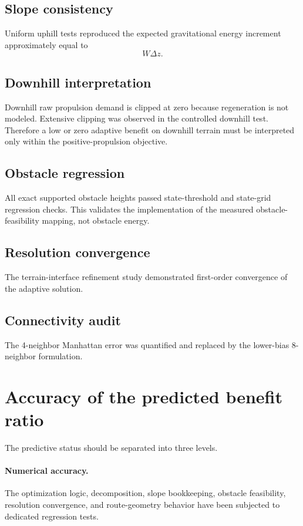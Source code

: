 \documentclass[11pt]{article}
\begin{document}
\subsection{Slope consistency}
Uniform uphill tests reproduced the expected gravitational energy increment approximately equal to
\begin{equation}
W\Delta z.
\end{equation}

\subsection{Downhill interpretation}
Downhill raw propulsion demand is clipped at zero because regeneration is not modeled. Extensive clipping was observed in the controlled downhill test. Therefore a low or zero adaptive benefit on downhill terrain must be interpreted only within the positive-propulsion objective.

\subsection{Obstacle regression}
All exact supported obstacle heights passed state-threshold and state-grid regression checks. This validates the implementation of the measured obstacle-feasibility mapping, not obstacle energy.

\subsection{Resolution convergence}
The terrain-interface refinement study demonstrated first-order convergence of the adaptive solution.

\subsection{Connectivity audit}
The 4-neighbor Manhattan error was quantified and replaced by the lower-bias 8-neighbor formulation.

\section{Accuracy of the predicted benefit ratio}

The predictive status should be separated into three levels.

\paragraph{Numerical accuracy.}
The optimization logic, decomposition, slope bookkeeping, obstacle feasibility, resolution convergence, and route-geometry behavior have been subjected to dedicated regression tests.
\end{document}
